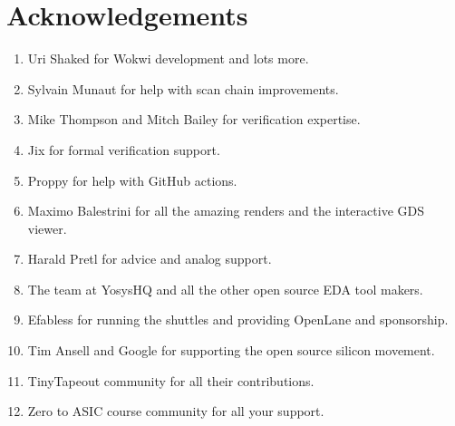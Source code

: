 \section{Acknowledgements}
\label{sec:acknowledgements}

\begin{enumerate}
    \item Uri Shaked for Wokwi development and lots more.
    \item Sylvain Munaut for help with scan chain improvements.
    \item Mike Thompson and Mitch Bailey for verification expertise.
    \item Jix for formal verification support.
    \item Proppy for help with GitHub actions.
    \item Maximo Balestrini for all the amazing renders and the interactive GDS viewer.
    \item Harald Pretl for advice and analog support.
    \item The team at YosysHQ and all the other open source EDA tool makers.
    \item Efabless for running the shuttles and providing OpenLane and sponsorship.
    \item Tim Ansell and Google for supporting the open source silicon movement.
    \item TinyTapeout community for all their contributions.
    \item Zero to ASIC course community for all your support.
\end{enumerate}
